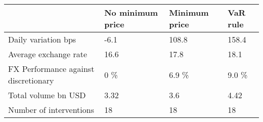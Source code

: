 \begin{tabular}{llll}
\toprule
{} & No minimum price & Minimum price & VaR rule \\
\midrule
Daily variation bps                  &             -6.1 &         108.8 &    158.4 \\
Average exchange rate                &             16.6 &          17.8 &     18.1 \\
FX Performance against discretionary &              0 \% &         6.9 \% &    9.0 \% \\
Total volume bn USD                  &             3.32 &           3.6 &     4.42 \\
Number of interventions              &               18 &            18 &       18 \\
\bottomrule
\end{tabular}
